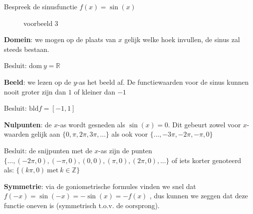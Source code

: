 \begin{voorbeeld}
	Bespreek de sinusfunctie $f(x)=\sin(x)$ 

\begin{figure}[H]
	\centering          
	
	\caption{voorbeeld 3}
	\label{fig:reele_functies_vb3}	
\end{figure}


\textbf{Domein}: we mogen op de plaats van $x$ gelijk welke
hoek invullen, de sinus zal steeds bestaan.

Besluit: $\textrm{dom}\:y=\mathbb{R}$ 




\textbf{Beeld}: we lezen op de $y$-as het beeld af. De
functiewaarden voor de sinus kunnen nooit groter zijn dan $1$ of
kleiner dan $-1$

Besluit: $\textrm{bld}f=[-1,1]$




\textbf{Nulpunten}: de $x$-as wordt gesneden als $\sin(x)=0$.
Dit gebeurt zowel voor $x$-waarden gelijk aan $\{0,\pi,2\pi,3\pi,...\}$
als ook voor $\{...,-3\pi,-2\pi,-\pi,0\}$

Besluit: de snijpunten met de $x$-as zijn de punten $\{...,(-2\pi,0),(-\pi,0),(0,0),(\pi,0),(2\pi,0),...\}$
of iets korter genoteerd als: $\{(k\pi,0)\:\textrm{met}\:k\in\mathbb{Z}\}$




\textbf{Symmetrie}: via de goniometrische formules vinden
we snel dat $f(-x)=\sin(-x)=-\sin(x)=-f(x)$ , dus kunnen we zeggen
dat deze functie oneven is (symmetrisch t.o.v. de oorsprong).

\end{voorbeeld}